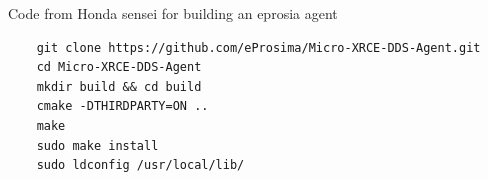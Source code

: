\documentclass[10pt]{article}
\begin{document}
Code from Honda sensei for building an eprosia agent
\begin{tcolorbox}
  \begin{verbatim}
    git clone https://github.com/eProsima/Micro-XRCE-DDS-Agent.git
    cd Micro-XRCE-DDS-Agent
    mkdir build && cd build
    cmake -DTHIRDPARTY=ON ..
    make
    sudo make install
    sudo ldconfig /usr/local/lib/
  \end{verbatim}
\end{tcolorbox}







\end{document}
